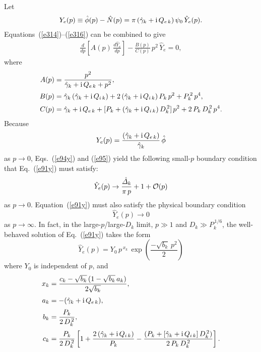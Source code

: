 \documentclass[12pt,prb,aps]{revtex4-1}
\begin{document}
Let 
\begin{align}\label{e95}
Y_e(p)\equiv \hat{\phi}(p)-\hat{N}(p)= \pi\,(\hat{\gamma}_k+{\rm i}\,Q_{e\,k})\,\psi_0\,\hat{Y}_e(p).
\end{align}
 Equations~(\ref{e314})--(\ref{e316}) can be combined to give\,\cite{cole,diff}
\begin{align}\label{e91y}
\frac{d}{dp}\!\left[A(p)\,\frac{d\hat{Y}_e}{dp}\right] - \frac{B(p)}{C(p)}\,p^2\,\hat{Y}_e=0,
\end{align}
where
\begin{align}
A(p) &= \frac{p^2}{\hat{\gamma}_k+{\rm i}\,Q_{e\,k}+p^2},\label{e97a}\\[0.5ex]
B(p)&=\hat{\gamma}_k\,(\hat{\gamma}_k+{\rm i}\,Q_{i\,k})+2\,(\hat{\gamma}_k+{\rm i}\,Q_{i\,k})\,P_k\,p^2 +P_k^{\,2}\,p^4,\\[0.5ex]
C(p) &=\hat{\gamma}_k+{\rm i}\,Q_{e\,k}+ [P_k+
(\hat{\gamma}_k+{\rm i}\,Q_{i\,k})\,D_k^{\,2}]\,p^2 + 2\,P_k\,D_k^{\,2}\,p^4.
\end{align}
Because
\begin{equation}
Y_e(p) =\frac{(\hat{\gamma}_k+{\rm i}\,Q_{e\,k})}{\hat{\gamma}_k}\,\hat{\phi}
\end{equation}
as $p\rightarrow 0$, Eqs.~(\ref{e94y}) and (\ref{e95})
yield the following small-$p$ boundary condition that Eq.~(\ref{e91y}) must satisfy:
\begin{equation}\label{e101}
\hat{Y}_e(p)\rightarrow\frac{\hat{\mit\Delta}_k}{\pi\,p} + 1+ {\cal O}(p)
\end{equation}
as $p\rightarrow 0$.  Equation~(\ref{e91y}) must also satisfy the  physical boundary condition 
\begin{equation}\label{e102}
\hat{Y}_e(p)\rightarrow 0
\end{equation}
as $p\rightarrow\infty$. 
In fact, in the large-$p$/large-$D_k$ limit, $p\gg 1$ and $D_k\gg P_k^{\,1/6}$, the well-behaved solution of Eq.~(\ref{e91y}) takes the form 
\begin{equation}\label{d33}
\hat{Y}_e(p) = Y_0\,p^{\,x_k}\,\exp\left(\frac{-\sqrt{b_k}\,p^2}{2}\right)
\end{equation}
where $Y_0$ is independent of $p$, and
\begin{align}
x_k&= \frac{c_k -\sqrt{b_k}\,(1-\sqrt{b_k}\,a_k)}{2\sqrt{b_k}},\\[0.5ex]
a_k &= -(\hat{\gamma}_k+ {\rm i}\,Q_{e\,k}),\\[0.5ex]
b_k&= \frac{P_k}{2\,D_k^{\,2}},\\[0.5ex]
c_k&= \frac{P_k}{2\,D_k^{\,2}}\left[1+\frac{2\, (\hat{\gamma}_k+{\rm i}\,Q_{i\,k})}{P_k}-\frac{(P_k+[\hat{\gamma}_k+{\rm i}\,Q_{i\,k}]\,D_k^{\,2})}{2\,P_k\,D_k^{\,2}}\right].
\end{align}
\end{document}
